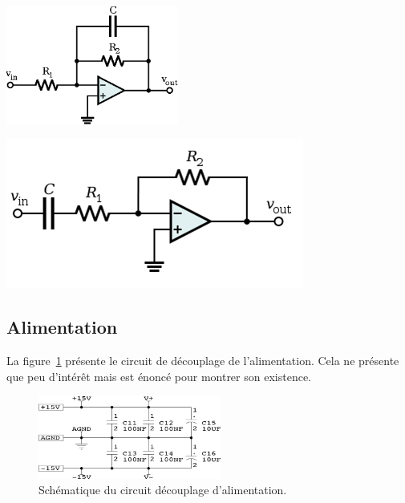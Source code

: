 \documentclass[10pt, oneside, a4paper]{article}
\begin{document}
\begin{minipage}[t]{.45\textwidth}
    \centering
    \includegraphics[height=110pt]{eps/active-lowpass-filter-rc.eps}
    \label{fig:filtreLowpass}
\end{minipage} \hfill
\begin{minipage}[t]{.45\textwidth}
    \centering
    \includegraphics[width=\textwidth]{image/active-highpass-filter-rc.png}
    \label{fig:filtreHighpass}
\end{minipage}

\subsection{Alimentation}
La figure~\ref{fig:alimDecouplage} présente le circuit de découplage de l'alimentation.
Cela ne présente que peu d'intérêt mais est énoncé pour montrer son existence.

\begin{figure}[!ht]
	\centering
	\includegraphics[width=6cm]{image/sch-alim.png}
	\caption{Schématique du circuit découplage d'alimentation.}
	\label{fig:alimDecouplage}
\end{figure}
\end{document}
